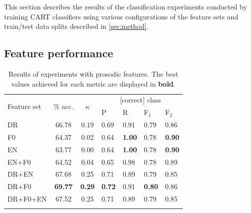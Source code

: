 \documentclass[a4paper]{article}
\begin{document}
	This section describes the results of the classification experiments conducted by training CART classifiers using various configurations of the feature sets and train/test data splits described in \cref{sec:method}. 
	
		\subsection{Feature performance}
		\label{sec:results:features}		
		
		\begin{table}
			\centering
			\caption[Results of experiments with prosodic features]{Results of experiments with prosodic features.%
			The best values achieved for each metric are displayed in \textbf{bold}.
			}
			\begin{tabularx}{\columnwidth}{lccXXXX}			
			
			\toprule
			\multirow{2}{*}{Feature set} & \multirow{2}{*}{\% acc.} & \multirow{2}{*}{$\kappa$} & \multicolumn{4}{c}{[correct] class} \\
			 \cmidrule(lr){4-7}
			& & & P & R & F$_1$ & F$_2$ \\
			\midrule
		
DR	&	66.78	&	0.19	&	0.69	&	0.91	&	0.79	&	0.86	\\
F0		&	64.37	&	0.02	&	0.64	&	\textbf{1.00}	&	0.78	&	\textbf{0.90}	\\
EN		&	63.77	&	0.00	&	0.64	&	\textbf{1.00}	&	0.78	&	\textbf{0.90}	\\
\addlinespace											
EN+F0		&	64.52	&	0.04	&	0.65	&	0.98	&	0.78	&	0.89	\\
DR+EN	&	67.68	&	0.25	&	0.71	&	0.89	&	0.79	&	0.85	\\
DR+F0		&	\textbf{69.77}	&	\textbf{0.29}	&	\textbf{0.72}	&	0.91	&	\textbf{0.80}	&	0.86	\\
\addlinespace											
DR+F0+EN &	67.52	&	0.25	&	0.71	&	0.89	&	0.79	&	0.85	\\		
			\bottomrule
			\label{tab:results:prosody}
			\end{tabularx}
		\end{table}
		
\end{document}
